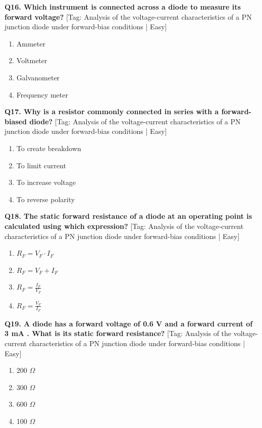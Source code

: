 \noindent\textbf{Q16. Which instrument is connected across a diode to measure its forward voltage?} \hfill [Tag: Analysis of the voltage-current characteristics of a PN junction diode under forward-bias conditions | Easy]
\begin{enumerate}[label=(\alph*),topsep=2pt,itemsep=1pt,partopsep=0pt,parsep=0pt]
    \item {Ammeter}
    \item {Voltmeter}
    \item {Galvanometer}
    \item {Frequency meter}
\end{enumerate}
\vspace{2mm}

\noindent\textbf{Q17. Why is a resistor commonly connected in series with a forward-biased diode?} \hfill [Tag: Analysis of the voltage-current characteristics of a PN junction diode under forward-bias conditions | Easy]
\begin{enumerate}[label=(\alph*),topsep=2pt,itemsep=1pt,partopsep=0pt,parsep=0pt]
    \item {To create breakdown}
    \item {To limit current}
    \item {To increase voltage}
    \item {To reverse polarity}
\end{enumerate}
\vspace{2mm}

\noindent\textbf{Q18. The static forward resistance of a diode at an operating point is calculated using which expression?} \hfill [Tag: Analysis of the voltage-current characteristics of a PN junction diode under forward-bias conditions | Easy]
\begin{enumerate}[label=(\alph*),topsep=2pt,itemsep=1pt,partopsep=0pt,parsep=0pt]
    \item {$R_F = V_F \cdot I_F$}
    \item {$R_F = V_F + I_F$}
    \item {$R_F = \frac{I_F}{V_F}$}
    \item {$R_F = \frac{V_F}{I_F}$}
\end{enumerate}
\vspace{2mm}

\noindent\textbf{Q19. A diode has a forward voltage of 0.6 V and a forward current of 3 mA . What is its static forward resistance?} \hfill [Tag: Analysis of the voltage-current characteristics of a PN junction diode under forward-bias conditions | Easy]
\begin{enumerate}[label=(\alph*),topsep=2pt,itemsep=1pt,partopsep=0pt,parsep=0pt]
    \item {200 $\Omega$}
    \item {300 $\Omega$}
    \item {600 $\Omega$}
    \item {100 $\Omega$}
\end{enumerate}
\vspace{2mm}

